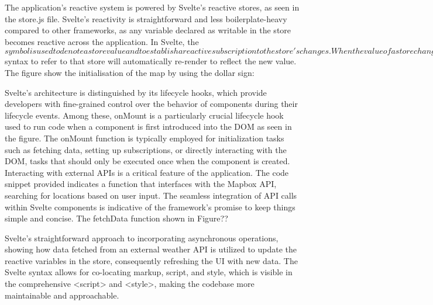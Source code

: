The application's reactive system is powered by Svelte's reactive stores, as seen in the store.js file. Svelte's reactivity is straightforward and less boilerplate-heavy compared to other frameworks, as any variable declared as writable in the store becomes reactive across the application. In Svelte, the $ symbol is used to denote a store value and to establish a reactive subscription to the store's changes. When the value of a store changes, any component that uses the $ syntax to refer to that store will automatically re-render to reflect the new value. The figure show the initialisation of the map by using the dollar sign:

Svelte's architecture is distinguished by its lifecycle hooks, which provide developers with fine-grained control over the behavior of components during their lifecycle events. Among these, onMount is a particularly crucial lifecycle hook used to run code when a component is first introduced into the DOM as seen in the figure.
The onMount function is typically employed for initialization tasks such as fetching data, setting up subscriptions, or directly interacting with the DOM, tasks that should only be executed once when the component is created.
Interacting with external APIs is a critical feature of the application. The code snippet provided indicates a function that interfaces with the Mapbox API, searching for locations based on user input. The seamless integration of API calls within Svelte components is indicative of the framework's promise to keep things simple and concise. The fetchData function shown in Figure??

Svelte's straightforward approach to incorporating asynchronous operations, showing how data fetched from an external weather API is utilized to update the reactive variables in the store, consequently refreshing the UI with new data.
The Svelte syntax allows for co-locating markup, script, and style, which is visible in the comprehensive <script> and <style>, making the codebase more maintainable and approachable.


